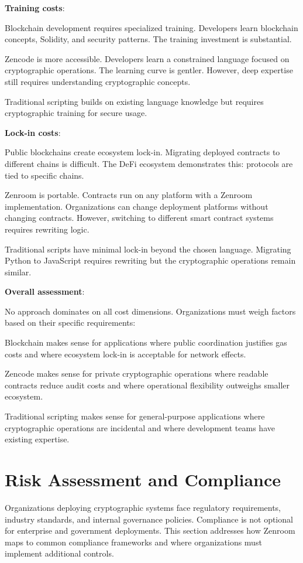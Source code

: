\textbf{Training costs}:

Blockchain development requires specialized training. Developers learn
blockchain concepts, Solidity, and security patterns. The training
investment is substantial.

Zencode is more accessible. Developers learn a constrained language
focused on cryptographic operations. The learning curve is
gentler. However, deep expertise still requires understanding
cryptographic concepts.

Traditional scripting builds on existing language knowledge but
requires cryptographic training for secure usage.

\textbf{Lock-in costs}:

Public blockchains create ecosystem lock-in. Migrating deployed
contracts to different chains is difficult. The DeFi ecosystem
demonstrates this: protocols are tied to specific chains.

Zenroom is portable. Contracts run on any platform with a Zenroom
implementation. Organizations can change deployment platforms without
changing contracts. However, switching to different smart contract
systems requires rewriting logic.

Traditional scripts have minimal lock-in beyond the chosen
language. Migrating Python to JavaScript requires rewriting but the
cryptographic operations remain similar.

\textbf{Overall assessment}:

No approach dominates on all cost dimensions. Organizations must weigh
factors based on their specific requirements:

Blockchain makes sense for applications where public coordination
justifies gas costs and where ecosystem lock-in is acceptable for
network effects.

Zencode makes sense for private cryptographic operations where
readable contracts reduce audit costs and where operational
flexibility outweighs smaller ecosystem.

Traditional scripting makes sense for general-purpose applications
where cryptographic operations are incidental and where development
teams have existing expertise.

\section{Risk Assessment and Compliance}

Organizations deploying cryptographic systems face regulatory
requirements, industry standards, and internal governance
policies. Compliance is not optional for enterprise and government
deployments. This section addresses how Zenroom maps to common
compliance frameworks and where organizations must implement
additional controls.

